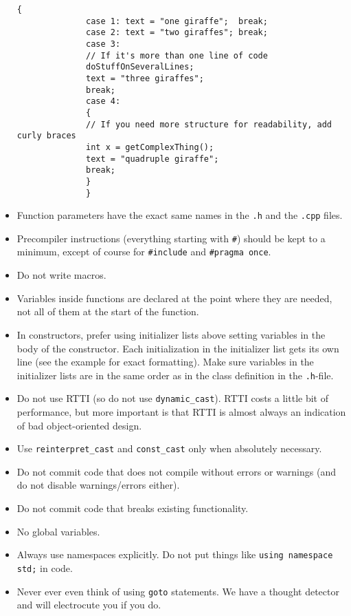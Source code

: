 \documentclass{article}
\begin{document}
\begin{itemize}
\begin{Verbatim}[fontsize=\small]
              {
              case 1: text = "one giraffe";  break;
              case 2: text = "two giraffes"; break;
              case 3:
              // If it's more than one line of code
              doStuffOnSeveralLines;
              text = "three giraffes";
              break;
              case 4:
              {
              // If you need more structure for readability, add curly braces
              int x = getComplexThing();
              text = "quadruple giraffe";
              break;
              }
              }
          \end{Verbatim}
    \item Function parameters have the exact same names in the \texttt{.h} and the \texttt{.cpp} files.
    \item Precompiler instructions (everything starting with \texttt{\#}) should be kept to a minimum, except of course for \texttt{\#include} and \texttt{\#pragma once}.
    \item Do not write macros.
    \item Variables inside functions are declared at the point where they are needed, not all of them at the start of the function.
    \item In constructors, prefer using initializer lists above setting variables in the body of the constructor. Each initialization in the initializer list gets its own line (see the example for exact formatting). Make sure variables in the initializer lists are in the same order as in the class definition in the \texttt{.h}-file.
    \item Do not use RTTI (so do not use \texttt{dynamic\_cast}). RTTI costs a little bit of performance, but more important is that RTTI is almost always an indication of bad object-oriented design.
    \item Use \texttt{reinterpret\_cast} and \texttt{const\_cast} only when absolutely necessary.
    \item Do not commit code that does not compile without errors or warnings (and do not disable warnings/errors either).
    \item Do not commit code that breaks existing functionality.
    \item No global variables.
    \item Always use namespaces explicitly. Do not put things like \texttt{using namespace std;} in code.
    \item Never ever even think of using \texttt{goto} statements. We have a thought detector and will electrocute you if you do.

\end{itemize}
\end{document}
